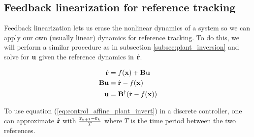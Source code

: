 \subsection{Feedback linearization for reference tracking}

Feedback linearization lets us erase the nonlinear dynamics of a system so we
can apply our own (usually linear) dynamics for \gls{reference} tracking. To do
this, we will perform a similar procedure as in subsection
\ref{subsec:plant_inversion} and solve for $\mathbf{u}$ given the \gls{reference}
dynamics in $\dot{\mathbf{r}}$.

\begin{align}
  \dot{\mathbf{r}} &= f(\mathbf{x}) + \mathbf{B}\mathbf{u} \nonumber \\
  \mathbf{B}\mathbf{u} &= \dot{\mathbf{r}} - f(\mathbf{x}) \nonumber \\
  \mathbf{u} &= \mathbf{B}^\dagger (\dot{\mathbf{r}} - f(\mathbf{x}))
    \label{eq:control_affine_plant_invert}
\end{align}

\begin{remark}
  To use equation (\ref{eq:control_affine_plant_invert}) in a discrete
  controller, one can approximate $\dot{\mathbf{r}}$ with
  $\frac{\mathbf{r}_{k + 1} - \mathbf{r}_k}{T}$ where $T$ is the time period between
  the two \glspl{reference}.
\end{remark}
